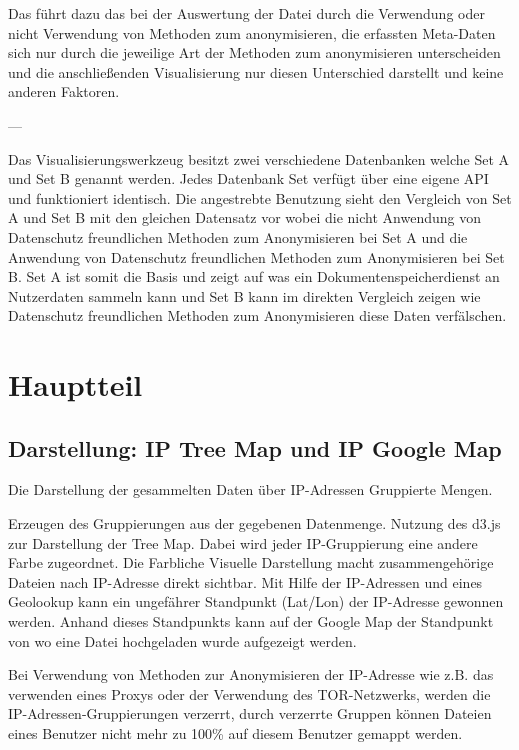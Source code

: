 \documentclass[
    fontsize=12pt,
    headings=small,
    parskip=half,           %
    bibliography=totoc,
    numbers=noenddot,       %
    open=any,               %
    ]{scrreprt}
\begin{document}
Das führt dazu das bei der Auswertung der Datei durch die Verwendung oder nicht Verwendung von Methoden zum anonymisieren, die erfassten Meta-Daten sich nur durch die jeweilige Art der Methoden zum anonymisieren unterscheiden und die anschließenden Visualisierung nur diesen Unterschied darstellt und keine anderen Faktoren. 

---

Das Visualisierungswerkzeug besitzt zwei verschiedene Datenbanken welche Set A und Set B genannt werden. 
Jedes Datenbank Set verfügt über eine eigene API und funktioniert identisch. Die angestrebte Benutzung sieht den Vergleich von Set A und Set B mit den gleichen Datensatz vor wobei die nicht Anwendung von Datenschutz freundlichen Methoden zum Anonymisieren bei Set A und die Anwendung von Datenschutz freundlichen Methoden zum Anonymisieren bei Set B. Set A ist somit die Basis und zeigt auf was ein Dokumentenspeicherdienst an Nutzerdaten sammeln kann und Set B kann im direkten Vergleich zeigen wie Datenschutz freundlichen Methoden zum Anonymisieren diese Daten verfälschen.

\chapter{Hauptteil}

\section{Darstellung: IP Tree Map und IP Google Map}

Die Darstellung der gesammelten Daten über IP-Adressen Gruppierte Mengen.

Erzeugen des Gruppierungen aus der gegebenen Datenmenge. Nutzung des d3.js zur Darstellung der Tree Map. Dabei wird jeder IP-Gruppierung eine andere Farbe zugeordnet. Die Farbliche Visuelle Darstellung macht zusammengehörige Dateien nach IP-Adresse direkt sichtbar. Mit Hilfe der IP-Adressen und eines Geolookup kann ein ungefährer Standpunkt (Lat/Lon) der IP-Adresse gewonnen werden. Anhand dieses Standpunkts kann auf der Google Map der Standpunkt von wo eine Datei hochgeladen wurde aufgezeigt werden. 

Bei Verwendung von Methoden zur Anonymisieren der IP-Adresse wie z.B. das verwenden eines Proxys oder der Verwendung des TOR-Netzwerks, werden die IP-Adressen-Gruppierungen verzerrt, durch verzerrte Gruppen können Dateien eines Benutzer nicht mehr zu 100\% auf diesem Benutzer gemappt werden.
\end{document}
